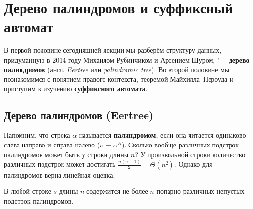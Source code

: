 \section{Дерево палиндромов и суффиксный автомат}

В первой половине сегодняшней лекции мы разберём структуру данных, придуманную в 2014 году Михаилом Рубинчиком и Арсением Шуром, "--- \textbf{дерево палиндромов} (англ. \textit{Eertree} или \textit{palindromic tree}). Во второй половине мы познакомимся с понятием правого контекста, теоремой Майхилла--Нероуда и приступим к изучению \textbf{суффиксного автомата}.

\subsection{Дерево палиндромов (Eertree)}

Напомним, что строка $\alpha$ называется \textbf{палиндромом}, если она читается одинаково слева направо и справа налево ($\alpha = \alpha^R$). Сколько вообще различных подстрок-палиндромов может быть у строки длины $n$? У произвольной строки количество различных подстрок может достигать $\frac{n(n+1)}{2} = \Theta(n^2)$. Однако для палиндромов верна линейная оценка.

\begin{lemma}\label{lem:pal_count}
    В любой строке $s$ длины $n$ содержится не более $n$ попарно различных непустых подстрок-палиндромов.
\end{lemma}

